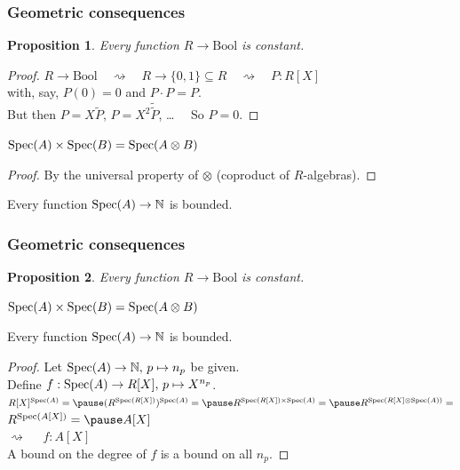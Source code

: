 \documentclass[aspectratio=1610]{beamer}
\newtheorem{proposition}{Proposition}
\begin{document}
\begin{frame}
  \frametitle{Geometric consequences}

  \begin{proposition}
    Every function $R \to \mathrm{Bool}$ is constant.
  \end{proposition}
  \begin{proof}
    \pause%
    $R \to \mathrm{Bool}
    \quad\rightsquigarrow\quad R \to \{0, 1\} \subseteq R
    \quad\rightsquigarrow\quad P : R[X]$\\
    \pause%
    with, say, $P(0) = 0$ and $P \cdot P = P$.\\
    \pause%
    But then $P = X\widetilde{P}$, \pause%
    $P = X^2\widetilde{\widetilde{P}}$, \dots$\quad$ So $P = 0$.
  \end{proof}

  \pause%
  \begin{lemma}
    $\operatorname{Spec}(A) \times \operatorname{Spec}(B) = \operatorname{Spec}(A \otimes B)$
  \end{lemma}
  \begin{proof}
    By the universal property of $\otimes$ (coproduct of $R$-algebras).
  \end{proof}

  \pause%
  \begin{theorem}
    Every function $\operatorname{Spec}(A) \to \mathbb{N}$ is bounded.
  \end{theorem}
\end{frame}

\begin{frame}
  \frametitle{Geometric consequences}

  \begin{proposition}
    Every function $R \to \mathrm{Bool}$ is constant.
  \end{proposition}

  \begin{lemma}
    $\operatorname{Spec}(A) \times \operatorname{Spec}(B) = \operatorname{Spec}(A \otimes B)$
  \end{lemma}

  \begin{theorem}
    Every function $\operatorname{Spec}(A) \to \mathbb{N}$ is bounded.
  \end{theorem}
  \begin{proof}
    Let $\operatorname{Spec}(A) \to \mathbb{N},\, p \mapsto n_p$ be given.\\
    \pause%
    Define $f : \operatorname{Spec}(A) \to R[X],\, p \mapsto X^{n_p}$.\\
    \pause%
    $R[X]^{\Spec(A)} = \pause
    (R^{\Spec(R[X])})^{\Spec(A)} = \pause
    R^{\Spec(R[X]) \times \Spec(A)} = \pause
    R^{\Spec(R[X] \otimes \Spec(A))} =$\\
    \pause%
    $R^{\Spec(A[X])} = \pause A[X]$\\
    \pause%
    $\rightsquigarrow\quad$ $f : A[X]$\\
    \pause%
    A bound on the degree of $f$ is a bound on all $n_p$.
  \end{proof}
\end{frame}
\end{document}
